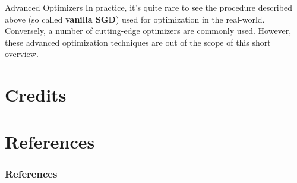 \documentclass[aspectratio=169]{beamer}
\begin{document}

\begin{frame}{Advanced Optimizers}
In practice, it's quite rare to see the procedure described above (so called \textbf{vanilla SGD}) used for optimization in the real-world.\\
\vspace{0.5cm}
Conversely, a number of cutting-edge optimizers  \cite{kingma2014adam,duchi2011adaptive,zeiler2012adadelta} are commonly used. However, these advanced optimization techniques are out of the scope of this short overview.
\end{frame}


\section{Credits}



\section{References}

\begin{frame}[t, allowframebreaks]
\frametitle{References}


\end{frame}
\end{document}
